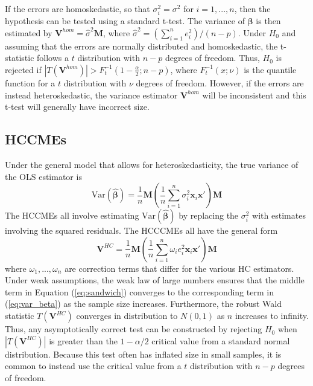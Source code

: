 \documentclass[12pt]{article}\usepackage[]{graphicx}\usepackage[]{color}
\newcommand{\Var}{\text{Var}}
\newcommand{\bm}{\mathbf}
\newcommand{\bs}{\boldsymbol}
\begin{document}
If the errors are homoskedastic, so that $\sigma_i^2 = \sigma^2$ for $i = 1,...,n$, then the hypothesis can be tested using a standard t-test. The variance of $\bs\beta$ is then estimated by $\bm{V}^{hom} = \hat\sigma^2 \bm{M}$, where $\hat\sigma^2 = \left(\sum_{i=1}^n e_i^2\right) / (n - p)$. Under $H_0$ and assuming that the errors are normally distributed and homoskedastic, the t-statistic follows a $t$ distribution with $n - p$ degrees of freedom. Thus, $H_0$ is rejected if $\left|T\left(\bm{V}^{hom}\right)\right| > F_t^{-1}\left(1 - \frac{\alpha}{2}; n - p\right)$, where $F_t^{-1}(x; \nu)$ is the quantile function for a $t$ distribution with $\nu$ degrees of freedom. However, if the errors are instead heteroskedastic, the variance estimator $\bm{V}^{hom}$ will be inconsistent and this t-test will generally have incorrect size. 

\subsection{HCCMEs}

Under the general model that allows for heteroskedasticity, the true variance of the OLS estimator is 
\begin{equation}
\label{eq:var_beta}
\Var\left(\bs{\hat\beta}\right) = \frac{1}{n} \bm{M} \left(\frac{1}{n}\sum_{i=1}^n \sigma_i^2 \bm{x}_i\bm{x}'\right) \bm{M}
\end{equation}
The HCCMEs all involve estimating $\Var\left(\bs{\hat\beta}\right)$ by replacing the $\sigma_i^2$ with estimates involving the squared residuals. The HCCCMEs all have the general form 
\begin{equation}
\label{eq:sandwich}
\bm{V}^{HC} = \frac{1}{n} \bm{M} \left(\frac{1}{n}\sum_{i=1}^n \omega_i e_i^2 \bm{x}_i\bm{x}'\right)\bm{M} 
\end{equation}
where $\omega_{1},...,\omega_{n}$ are correction terms that differ for the various HC estimators. Under weak assumptions, the weak law of large numbers ensures that the middle term in Equation (\ref{eq:sandwich}) converges to the corresponding term in (\ref{eq:var_beta}) as the sample size increases. Furthermore, the robust Wald statistic $T\left(\bm{V}^{HC}\right)$ converges in distribution to $N(0,1)$ as $n$ increases to infinity. Thus, any asymptotically correct test can be constructed by rejecting $H_0$ when $\left|T\left(\bm{V}^{HC}\right)\right|$ is greater than the $1 - \alpha / 2$ critical value from a standard normal distribution. Because this test often has inflated size in small samples, it is common to instead use the critical value from a $t$ distribution with $n - p$ degrees of freedom.
\end{document}
